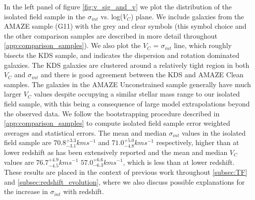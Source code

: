 \documentclass[fleqn,usenatbib]{mn2e}
\begin{document}
In the left panel of figure \ref{fig:v_sig_and_v} we plot the distribution of the isolated field sample in the $\sigma_{int}$ vs. log($V_{C}$) plane.
We include galaxies from the AMAZE sample (G11) with the grey and clear symbols (this symbol choice and the other comparison samples are described in more detail throughout \cref{app:comparison_samples}). 
We also plot the $V_{C}$ = $\sigma_{int}$ line, which roughly bisects the KDS sample, and indicates the dispersion and rotation dominated galaxies.
The KDS galaxies are clustered around a relatively tight region in both $V_{C}$ and $\sigma_{int}$ and there is good agreement between the KDS and AMAZE Clean samples.
The galaxies in the AMAZE Unconstrained sample generally have much larger $V_{C}$ values despite occupying a similar stellar mass range to our isolated field sample, with this being a consequence of large model extrapolations beyond the observed data.
We follow the bootstrapping procedure described in \cref{app:comparison_samples} to compute isolated field sample error weighted averages and statistical errors.
The mean and median $\sigma_{int}$ values in the isolated field sample are $70.8^{+3.3}_{-3.1} kms^{-1}$ and $71.0^{+5.0}_{-4.8} kms^{-1}$ respectively, higher than at lower redshift as has been extensively reported \citep[e.g.][]{Genzel2006,Genzel2008,ForsterSchreiber2009,Law2009,Gnerucci2011,Epinat2012,Wisnioski2015} and the mean and median $V_{C}$ values are $76.7^{+4.9}_{-4.5}kms^{-1}$ $57.0^{+6.6}_{-6.3}kms^{-1}$, which is less than at lower redshift.
These results are placed in the context of previous work throughout \cref{subsec:TF} and \cref{subsec:redshift_evolution}, where we also discuss possible explanations for the increase in $\sigma_{int}$ with redshift.\\
\end{document}
